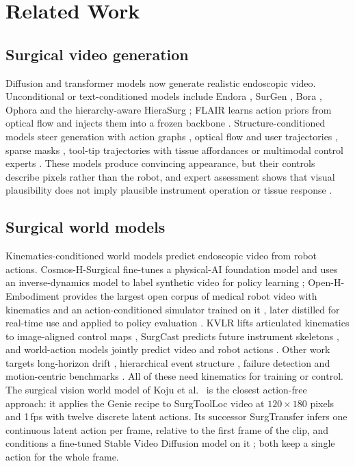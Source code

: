 \section{Related Work}
\subsection{Surgical video generation}
Diffusion and transformer models now generate realistic endoscopic video. Unconditional or text-conditioned models include Endora \cite{endora}, SurGen \cite{surgen}, Bora \cite{bora}, Ophora \cite{ophora} and the hierarchy-aware HieraSurg \cite{hierasurg}; FLAIR learns action priors from optical flow and injects them into a frozen backbone \cite{flair}. Structure-conditioned models steer generation with action graphs \cite{visage}, optical flow and user trajectories \cite{surgsora}, sparse masks \cite{surgiflowvid}, tool-tip trajectories with tissue affordances \cite{saw} or multimodal control experts \cite{suruniworld}. These models produce convincing appearance, but their controls describe pixels rather than the robot, and expert assessment shows that visual plausibility does not imply plausible instrument operation or tissue response \cite{surgveo}.

\subsection{Surgical world models}
Kinematics-conditioned world models predict endoscopic video from robot actions. Cosmos-H-Surgical fine-tunes a physical-AI foundation model and uses an inverse-dynamics model to label synthetic video for policy learning \cite{cosmoshsurg}; Open-H-Embodiment provides the largest open corpus of medical robot video with kinematics and an action-conditioned simulator trained on it \cite{openh}, later distilled for real-time use \cite{cosmoshdreams} and applied to policy evaluation \cite{cosmossurgdvrk}. KVLR lifts articulated kinematics to image-aligned control maps \cite{kvlr}, SurgCast predicts future instrument skeletons \cite{surgcast}, and world-action models jointly predict video and robot actions \cite{surgwam,endowam,jointvt}. Other work targets long-horizon drift \cite{surgvista}, hierarchical event structure \cite{s2hwm}, failure detection \cite{fomofd} and motion-centric benchmarks \cite{surgwmbench}. All of these need kinematics for training or control. The surgical vision world model of Koju et al.\ \cite{surgwm} is the closest action-free approach: it applies the Genie recipe \cite{genie} to SurgToolLoc video at $120\times180$ pixels and 1\,fps with twelve discrete latent actions. Its successor SurgTransfer infers one continuous latent action per frame, relative to the first frame of the clip, and conditions a fine-tuned Stable Video Diffusion model on it \cite{surgtransfer}; both keep a single action for the whole frame.


